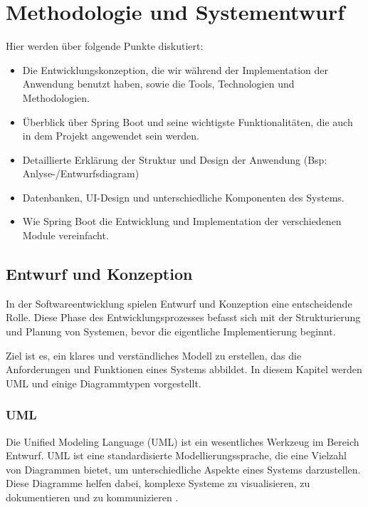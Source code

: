 \chapter{Methodologie und Systementwurf }

Hier werden über folgende Punkte diskutiert:

\begin{itemize}
	\item Die Entwicklungskonzeption, die wir während der Implementation der Anwendung benutzt haben, sowie die Tools, Technologien und Methodologien. 
	\item Überblick über Spring Boot und seine wichtigste  Funktionalitäten, die auch in dem Projekt angewendet sein werden. 
	\item Detaillierte Erklärung der Struktur und Design der Anwendung (Bsp: Anlyse-/Entwurfsdiagram) 
	\item Datenbanken, UI-Design und unterschiedliche Komponenten des Systems. 
	\item Wie Spring Boot die Entwicklung und Implementation der verschiedenen Module vereinfacht. 
\end{itemize}


\section{Entwurf und Konzeption}

In der Softwareentwicklung spielen Entwurf und Konzeption eine entscheidende Rolle. Diese Phase des Entwicklungsprozesses befasst sich mit der Strukturierung und Planung von Systemen, bevor die eigentliche Implementierung beginnt. 

Ziel ist es, ein klares und verständliches Modell zu erstellen, das die Anforderungen und Funktionen eines Systems abbildet. In diesem Kapitel werden UML und einige Diagrammtypen vorgestellt.

\subsection{UML}

Die Unified Modeling Language (UML) ist ein wesentliches Werkzeug im Bereich Entwurf. UML ist eine standardisierte Modellierungssprache, die eine Vielzahl von Diagrammen bietet, um unterschiedliche Aspekte eines Systems darzustellen. Diese Diagramme helfen dabei, komplexe Systeme zu visualisieren, zu dokumentieren und zu kommunizieren \cite{UML:2023}. 

